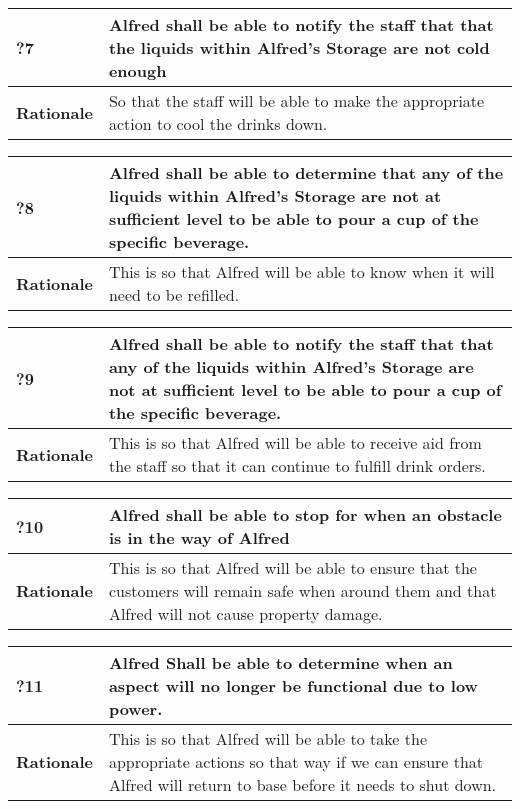 \documentclass [11pt]{article}
\begin{document}
\begin{longtable}{| p{ } | p{ } | }\hline 
	\rowcolor{tableCell}\textbf{?7} & Alfred shall be able to notify the staff that that the liquids within Alfred's Storage are not cold enough\\ \hline
	\textbf{Rationale} &  So that the staff will be able to make the appropriate action to cool the drinks down.\\ \hline 
\end{longtable}

\begin{longtable}{| p{ } | p{ } | }\hline 
	\rowcolor{tableCell}\textbf{?8} & Alfred shall be able to determine that any of the liquids within Alfred's Storage are not at sufficient level to be able to pour a cup of the specific beverage. \\ \hline
	\textbf{Rationale} &  This is so that Alfred will be able to know when it will need to be refilled.\\ \hline 
\end{longtable}

\begin{longtable}{| p{ } | p{ } | }\hline 
	\rowcolor{tableCell}\textbf{?9} & Alfred shall be able to notify the staff that that any of the liquids within Alfred's Storage are not at sufficient level to be able to pour a cup of the specific beverage. \\ \hline
	\textbf{Rationale} &  This is so that Alfred will be able to receive aid from the staff so that it can continue to fulfill drink orders.\\ \hline 
\end{longtable}

\begin{longtable}{| p{ } | p{ } | }\hline 
	\rowcolor{tableCell}\textbf{?10} & Alfred shall be able to stop for when an obstacle is in the way of Alfred \\ \hline
	\textbf{Rationale} &  This is so that Alfred will be able to ensure that the customers will remain safe when around them and that Alfred will not cause property damage.\\ \hline 
\end{longtable}


\begin{longtable}{| p{ } | p{ } | }\hline 
	\rowcolor{tableCell}\textbf{?11} & Alfred Shall be able to determine when an aspect will no longer be functional due to low power. \\ \hline
	\textbf{Rationale} &  This is so that Alfred will be able to take the appropriate actions so that way if we can ensure that Alfred will return to base before it needs to shut down.\\ \hline 
\end{longtable}
\end{document}
